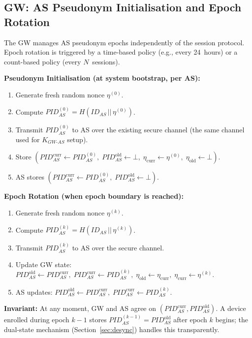 \documentclass[12pt,a4paper]{article}
\newcommand{\IDas}{\mathit{ID}_{AS}}
\newcommand{\PIDas}{\mathit{PID}_{AS}}
\newcommand{\PIDascurr}{\mathit{PID}_{AS}^{\mathrm{curr}}}
\newcommand{\PIDASOld}{\mathit{PID}_{AS}^{\mathrm{old}}}
\newcommand{\KGWas}{K_{GW\text{-}AS}}
\newcommand{\etacurr}{\eta_{\mathrm{curr}}}
\newcommand{\etaold}{\eta_{\mathrm{old}}}
\begin{document}
\subsection{GW: AS Pseudonym Initialisation and Epoch Rotation}
\label{sec:epoch-rotation}

The GW manages AS pseudonym epochs independently of the session
protocol.  Epoch rotation is triggered by a time-based policy
(e.g., every 24~hours) or a count-based policy (every $N$~sessions).

\medskip
\noindent\textbf{Pseudonym Initialisation (at system bootstrap, per AS):}
\begin{enumerate}[label=\textbf{GW.\arabic*}]
  \item Generate fresh random nonce $\eta^{(0)}$.
  \item Compute $\PIDas^{(0)} = H(\IDas \,||\, \eta^{(0)})$.
  \item Transmit $\PIDas^{(0)}$ to AS over the existing secure channel
        (the same channel used for $\KGWas$ setup).
  \item Store $(\PIDascurr \leftarrow \PIDas^{(0)},\;
               \PIDASOld \leftarrow \bot,\;
               \etacurr  \leftarrow \eta^{(0)},\;
               \etaold   \leftarrow \bot)$.
  \item AS stores $(\PIDascurr \leftarrow \PIDas^{(0)},\;
                   \PIDASOld \leftarrow \bot)$.
\end{enumerate}

\noindent\textbf{Epoch Rotation (when epoch boundary is reached):}
\begin{enumerate}[label=\textbf{GW.\arabic*}]
  \item Generate fresh random nonce $\eta^{(k)}$.
  \item Compute $\PIDas^{(k)} = H(\IDas \,||\, \eta^{(k)})$.
  \item Transmit $\PIDas^{(k)}$ to AS over the secure channel.
  \item Update GW state:
        $\PIDASOld \leftarrow \PIDascurr,\;
         \PIDascurr \leftarrow \PIDas^{(k)},\;
         \etaold \leftarrow \etacurr,\;
         \etacurr \leftarrow \eta^{(k)}$.
  \item AS updates:
        $\PIDASOld \leftarrow \PIDascurr,\;
         \PIDascurr \leftarrow \PIDas^{(k)}$.
\end{enumerate}

\begin{mdframed}[backgroundcolor=blue!5]
\textbf{Invariant:}
At any moment, GW and AS agree on $(\PIDascurr, \PIDASOld)$.
A device enrolled during epoch $k-1$ stores $\PIDas^{(k-1)} =
\PIDASOld$ after epoch $k$ begins; the dual-state mechanism (Section~\ref{sec:desync})
handles this transparently.
\end{mdframed}
\end{document}
